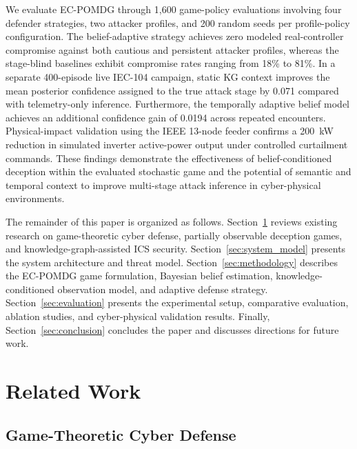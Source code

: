 \documentclass[10pt,conference]{IEEEtran}
\begin{document}
We evaluate EC-POMDG through 1,600 game-policy evaluations involving four defender strategies, two attacker profiles, and 200 random seeds per profile-policy configuration. The belief-adaptive strategy achieves zero modeled real-controller compromise against both cautious and persistent attacker profiles, whereas the stage-blind baselines exhibit compromise rates ranging from 18\% to 81\%. In a separate 400-episode live IEC-104 campaign, static KG context improves the mean posterior confidence assigned to the true attack stage by 0.071 compared with telemetry-only inference. Furthermore, the temporally adaptive belief model achieves an additional confidence gain of 0.0194 across repeated encounters. Physical-impact validation using the IEEE 13-node feeder confirms a 200~kW reduction in simulated inverter active-power output under controlled curtailment commands. These findings demonstrate the effectiveness of belief-conditioned deception within the evaluated stochastic game and the potential of semantic and temporal context to improve multi-stage attack inference in cyber-physical environments.

The remainder of this paper is organized as follows. Section~\ref{sec:related_work} reviews existing research on game-theoretic cyber defense, partially observable deception games, and knowledge-graph-assisted ICS security. Section~\ref{sec:system_model} presents the system architecture and threat model. Section~\ref{sec:methodology} describes the EC-POMDG game formulation, Bayesian belief estimation, knowledge-conditioned observation model, and adaptive defense strategy. Section~\ref{sec:evaluation} presents the experimental setup, comparative evaluation, ablation studies, and cyber-physical validation results. Finally, Section~\ref{sec:conclusion} concludes the paper and discusses directions for future work.


\section{Related Work}
\label{sec:related_work}

\subsection{Game-Theoretic Cyber Defense}
\end{document}
